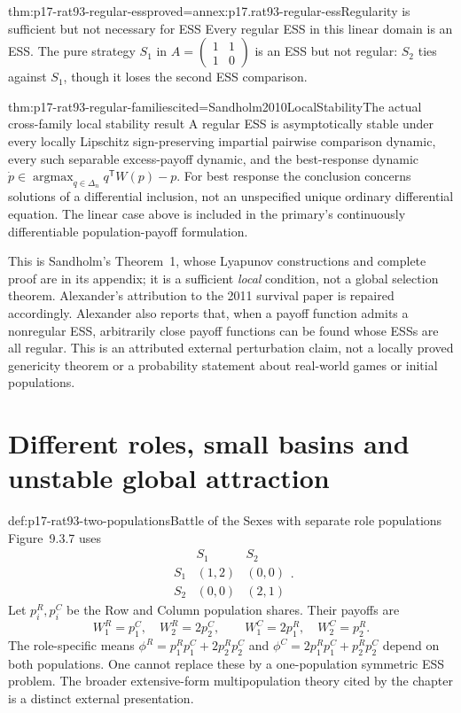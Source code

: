 \begin{hbtheorem}{thm:p17-rat93-regular-ess}{proved=annex:p17.rat93-regular-ess}{Regularity is sufficient but not necessary for ESS}
Every regular ESS in this linear domain is an ESS. The pure strategy
\(S_1\) in \(A=\left(\begin{smallmatrix}1&1\\1&0\end{smallmatrix}\right)\)
is an ESS but not regular: \(S_2\) ties against \(S_1\), though
it loses the second ESS comparison.
\end{hbtheorem}

\begin{hbtheorem}{thm:p17-rat93-regular-families}{cited=Sandholm2010LocalStability}{The actual cross-family local stability result}
A regular ESS is asymptotically stable under every locally Lipschitz
sign-preserving impartial pairwise comparison dynamic, every such
separable excess-payoff dynamic, and the best-response dynamic
\(\dot p\in\operatorname{argmax}_{q\in\Delta_n}q^{\mathsf T}W(p)-p\).
For best response the conclusion concerns solutions of a differential
inclusion, not an unspecified unique ordinary differential equation.
The linear case above is included in the primary's continuously
differentiable population-payoff formulation.
\end{hbtheorem}

This is Sandholm's Theorem~1, whose Lyapunov constructions and complete
proof are in its appendix; it is a sufficient \emph{local} condition,
not a global selection theorem. Alexander's attribution to the 2011
survival paper is repaired accordingly. Alexander also reports that,
when a payoff function admits a nonregular ESS, arbitrarily close payoff
functions can be found whose ESSs are all regular. This is an attributed
external perturbation claim, not a locally proved genericity theorem or
a probability statement about real-world games or initial populations.
\cite[Secs.~3--4 and appendix, pp.~33--35, 42--47]{Sandholm2010LocalStability}

\section{Different roles, small basins and unstable global attraction}
\label{sec:p17-rat93-limits}

\begin{hbexample}{def:p17-rat93-two-populations}{Battle of the Sexes with separate role populations}
Figure~9.3.7 uses
\[
 \begin{array}{c|cc}&S_1&S_2\\\hline
 S_1&(1,2)&(0,0)\\ S_2&(0,0)&(2,1)
 \end{array}.
\]
Let \(p_i^R,p_i^C\) be the Row and Column population shares.
Their payoffs are
\[
 W_1^R=p_1^C,\quad W_2^R=2p_2^C,
 \qquad W_1^C=2p_1^R,\quad W_2^C=p_2^R.
\]
The role-specific means
\(\phi^R=p_1^Rp_1^C+2p_2^Rp_2^C\) and
\(\phi^C=2p_1^Rp_1^C+p_2^Rp_2^C\) depend on both populations.
One cannot replace these by a one-population symmetric ESS problem.
The broader extensive-form multipopulation theory cited by the chapter
is a distinct external presentation.
\end{hbexample}

